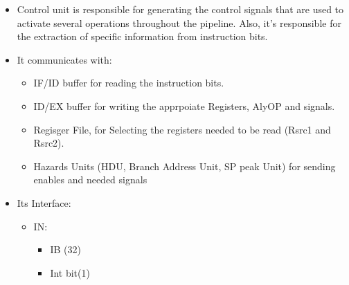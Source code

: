\documentclass[12pt]{report}
\begin{document}
\begin{itemize}
    \item Control unit is responsible for generating the control signals that are used to activate several operations throughout the pipeline. Also, it's responsible for the extraction of specific information from instruction bits.
    \item It communicates with:
    \begin{itemize}
        \item IF/ID buffer for reading the instruction bits.
        \item ID/EX buffer for writing the apprpoiate Registers, AlyOP and signals.
        \item Regisger File, for Selecting the registers needed to be read (Rsrc1 and Rsrc2).
        \item Hazards Units (HDU, Branch Address Unit, SP peak Unit) for sending enables and needed signals
    \end{itemize}
    \item Its Interface:
    \begin{itemize}
        \item IN: 
        \begin{itemize}
            \item IB (32)
            \item Int bit(1)
        \end{itemize}
    

\end{itemize}
\end{itemize}
\end{document}
